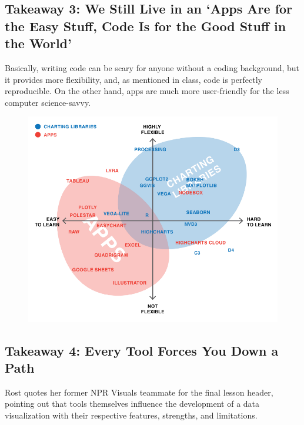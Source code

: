 \documentclass[]{book}
\theoremstyle{definition}
\theoremstyle{definition}
\theoremstyle{definition}
\theoremstyle{remark}
\begin{document}
\subsection{\texorpdfstring{Takeaway 3: We Still Live in an `Apps Are
for the Easy Stuff, Code Is for the Good Stuff in the
World'}{Takeaway 3: We Still Live in an Apps Are for the Easy Stuff, Code Is for the Good Stuff in the World}}\label{takeaway-3-we-still-live-in-an-apps-are-for-the-easy-stuff-code-is-for-the-good-stuff-in-the-world}

Basically, writing code can be scary for anyone without a coding
background, but it provides more flexibility, and, as mentioned in
class, code is perfectly reproducible. On the other hand, apps are much
more user-friendly for the less computer science-savvy.

\begin{figure}
\centering
\includegraphics{images/apps_vs_code.png}
\caption{}
\end{figure}

\subsection{Takeaway 4: Every Tool Forces You Down a
Path}\label{takeaway-4-every-tool-forces-you-down-a-path}

Rost quotes her former NPR Visuals teammate for the final lesson header,
pointing out that tools themselves influence the development of a data
visualization with their respective features, strengths, and
limitations.
\end{document}
